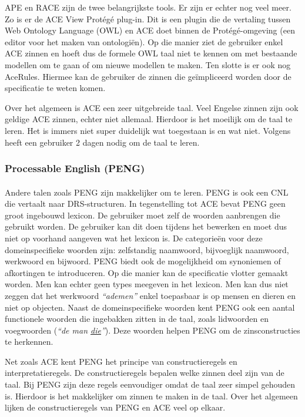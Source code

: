 \documentclass[]{article}
\theoremstyle{definition}
\newcommand{\example}[1]{\textit{``#1''}}
\begin{document}
APE en RACE zijn de twee belangrijkste tools. Er zijn er echter nog veel meer. Zo is er de ACE View Protégé plug-in. Dit is een plugin die de vertaling tussen Web Ontology Language (OWL) en ACE doet binnen de Protégé-omgeving (een editor voor het maken van ontologiën). Op die manier ziet de gebruiker enkel ACE zinnen en hoeft dus de formele OWL taal niet te kennen om met bestaande modellen om te gaan of om nieuwe modellen te maken. Ten slotte is er ook nog AceRules. Hiermee kan de gebruiker de zinnen die geïmpliceerd worden door de specificatie te weten komen.

Over het algemeen is ACE een zeer uitgebreide taal. Veel Engelse zinnen zijn ook geldige ACE zinnen, echter niet allemaal. Hierdoor is het moeilijk om de taal te leren. Het is immers niet super duidelijk wat toegestaan is en wat niet. Volgens \cite{Fuchs2008} heeft een gebruiker 2 dagen nodig om de taal te leren.

\subsubsection{Processable English (PENG)}
\paragraph{} Andere talen zoals PENG \cite{Schwitter2002} zijn makkelijker om te leren. PENG is ook een CNL die vertaalt naar DRS-structuren. In tegenstelling tot ACE bevat PENG geen groot ingebouwd lexicon. De gebruiker moet zelf de woorden aanbrengen die gebruikt worden. De gebruiker kan dit doen tijdens het bewerken en moet dus niet op voorhand aangeven wat het lexicon is. De categorieën voor deze domeinspecifieke woorden zijn: zelfstandig naamwoord, bijvoeglijk naamwoord, werkwoord en bijwoord. PENG biedt ook de mogelijkheid om synoniemen of afkortingen te introduceren. Op die manier kan de specificatie vlotter gemaakt worden. Men kan echter geen types meegeven in het lexicon. Men kan dus niet zeggen dat het werkwoord \example{ademen} enkel toepasbaar is op mensen en dieren en niet op objecten. Naast de domeinspecifieke woorden kent PENG ook een aantal functionele woorden die ingebakken zitten in de taal, zoals lidwoorden en voegwoorden (\example{de man \underline{die}}). Deze woorden helpen PENG om de zinsconstructies te herkennen.

Net zoals ACE kent PENG het principe van constructieregels en interpretatieregels. De constructieregels bepalen welke zinnen deel zijn van de taal. Bij PENG zijn deze regels eenvoudiger omdat de taal zeer simpel gehouden is. Hierdoor is het makkelijker om zinnen te maken in de taal. Over het algemeen lijken de constructieregels van PENG en ACE veel op elkaar.
\end{document}
